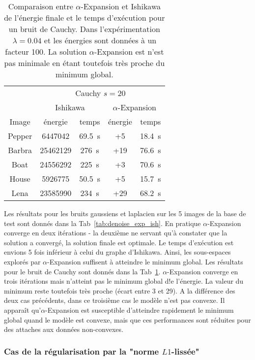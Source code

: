 \documentclass[../main/These_Mathias_Paget.tex]{subfiles}
\begin{document}
\begin{table}
\centering
\begin{tabular}{c|cc|cc|}
 & \multicolumn{4}{c|}{Cauchy $s=20$} \\
&  \multicolumn{2}{c|}{Ishikawa}  & \multicolumn{2}{c|}{$\alpha$-Expansion}   \\
Image & énergie & temps & énergie & temps \\
\hline
Pepper &  \num{6447042} & \SI{69,5}{s} & +\num{5} & \SI{18,4}{s}  \\
Barbra & \num{25462129} & \SI{276}{s} & +\num{19} & \SI{76,6}{s} \\
Boat & \num{24556292} & \SI{225}{s}    & +\num{3} & \SI{70.6}{s} \\
House & \num{5926775} & \SI{50,5}{s}    & +\num{5} & \SI{15.7}{s} \\
Lena & \num{23585990} & \SI{234}{s}    & +\num{29} & \SI{68.2}{s} \\
\end{tabular}
\caption{Comparaison entre $\alpha$-Expansion et Ishikawa de l'énergie finale et le temps d’exécution pour un bruit de Cauchy. Dans l'expérimentation $\lambda=0.04$ et les énergies sont données à un facteur 100. La solution $\alpha$-Expansion est n'est pas minimale en étant toutefois très proche du minimum global.}
\label{tab:denoise_exp_ish_2}
\end{table}

Les résultats pour les bruits gaussiens et laplacien sur les 5 images de la base de test sont donnés dans la Tab~\ref{tab:denoise_exp_ish}. En pratique $\alpha$-Expansion converge en deux itérations - la deuxième ne servant qu'à constater que la solution a convergé, la solution finale est optimale. Le temps d’exécution est envions 5 fois inférieur à celui du graphe d'Ishikawa. Ainsi, les sous-espaces explorés par $\alpha$-Expansion suffisent à atteindre le minimum global. Les résultats pour le bruit de Cauchy sont donnés dans la Tab~\ref{tab:denoise_exp_ish_2}. $\alpha$-Expansion converge en trois itérations mais n'atteint pas le minimum global d!e l'énergie. La valeur du minimum reste toutefois très proche (écart entre 3 et 29). A la différence des deux cas précédents, dans ce troisième cas le modèle n'est pas convexe. Il apparaît qu'$\alpha$-Expansion est susceptible d'atteindre rapidement le minimum global quand le modèle est convexe, mais que ces performances sont réduites pour des attaches aux données non-convexes.

\subsubsection{Cas de la régularisation par la "norme $L1$-lissée"}
\end{document}
